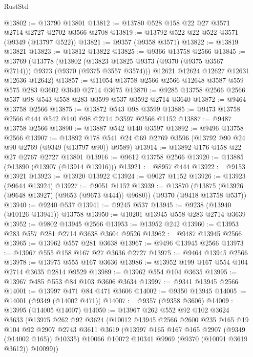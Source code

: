 \begin{lexlean}{RustStd}
\begin{coremodule}
@13802 := @13790 @13801
@13812 := @13780 @528 @158 @22 @27 @3571 @2714 @2727 @2702 @3566 @2708
@13819 := @13792 @522 @22 @522 @3571 (@9349 (@13797 @522))
@13821 := @9357 (@9358 @3571)
@13822 := @13819 @13821
@13823 := @13812 @13822
@13825 := @9366 @13758 @2566
@13845 := @13769
    (@13778
      (@13802 (@13823 @13825 @9373 (@9370 (@9375 @3567 @2714))) @9373 (@9370 (@9375 @3557 @3574)))
      @12621
      @12624
      @12627
      @12631
      @12636
      @12642)
@13857 := @11054 @13758 @2566 @2566 @12648 @3587 @559 @575 @283 @3602 @3640 @2714 @3675
@13870 := @9285 @13758 @2566 @2566 @537 @98 @543 @558 @283 @3599 @537 @3592 @2714 @3640
@13872 := @9464 @13758 @2566
@13875 := @13872 @543 @98 @3599
@13885 := @9473 @13758 @2566 @444 @542 @140 @98 @2714 @3597 @2566 @1152
@13887 := @9487 @13758 @2566
@13890 := @13887 @542 @140 @3597
@13892 := @9496 @13758 @2566
@13907 := @13892 @178 @541 @24 @69 @2769 @3596 (@13792 @90 @24 @90 @2769 (@9349 (@13797 @90)) @9589)
@13914 := @13892 @176 @158 @22 @27 @2767 @2727 @13801
@13916 := @9612 @13758 @2566
@13920 := @13885 (@13890 (@13907 (@13914 @13916)))
@13921 := @8957 @444
@13922 := @9153 @13921
@13923 := @13920 @13922
@13924 := @9027 @1152
@13926 := @13923 (@9644 @13924)
@13927 := @9051 @1152
@13939 := @13870
    (@13875 (@13926 (@9648 @13927) (@9653 (@9673 @444)) @9680))
    (@9370 (@9418 @13758 @537))
@13940 := @9240 @537
@13941 := @9245 @537
@13945 := @9238 (@13940 (@10126 @13941)) @13758
@13950 := @10201 @13945 @558 @283 @2714 @3639
@13952 := @9802 @13945 @2566
@13953 := @13952 @242
@13960 := @13953 @283 @557 @281 @2714 @3638 @3604 @9526
@13962 := @9487 @13945 @2566
@13965 := @13962 @557 @281 @3638
@13967 := @9496 @13945 @2566
@13973 := @13967 @555 @158 @167 @27 @3636 @2727
@13975 := @9464 @13945 @2566
@13978 := @13975 @555 @167 @3636
@13986 := @13952 @199 @167 @554 @104 @2714 @3635 @2814 @9529
@13989 := @13962 @554 @104 @3635
@13995 := @13967 @485 @553 @84 @103 @3606 @3634
@13997 := @9341 @13945 @2566
@14001 := @13997 @471 @84 @471 @3606
@14002 := @9350 @13945
@14005 := @14001 (@9349 (@14002 @471))
@14007 := @9357 (@9358 @3606)
@14009 := @13995 (@14005 @14007)
@14050 := @13967
    @262
    @552
    @92
    @102
    @3624
    @3633
    (@13975
      @262
      @92
      @3624
      (@10012
        @13945
        @2566
        @2600
        @235
        @165
        @19
        @104
        @92
        @2907
        @2743
        @3611
        @3619
        (@13997 @165 @167 @165 @2907 (@9349 (@14002 @165)) @10335)
        @10066
        @10072
        @10341
        @9969
        (@9370 (@10091 @3619 @3612))
        @10099))

\end{coremodule}
\end{lexlean}
